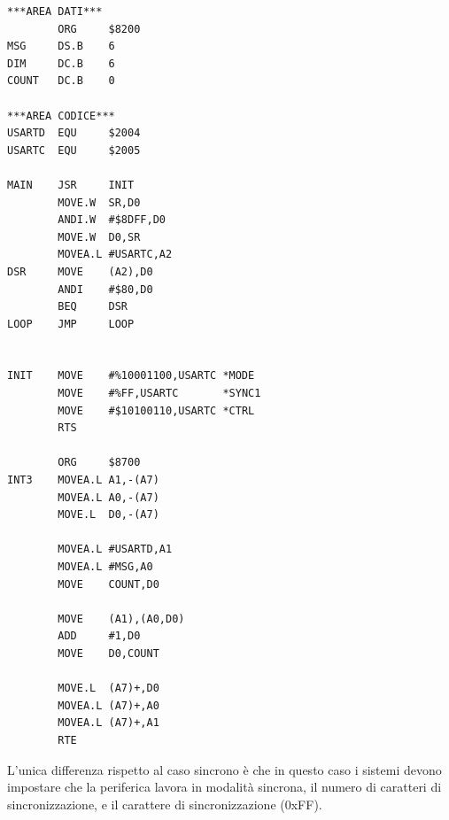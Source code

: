 \begin{lstlisting}
***AREA DATI*** 
        ORG     $8200
MSG     DS.B    6
DIM     DC.B    6
COUNT   DC.B    0

***AREA CODICE*** 
USARTD  EQU     $2004
USARTC  EQU     $2005 

MAIN    JSR     INIT 
        MOVE.W  SR,D0 
        ANDI.W  #$8DFF,D0 
        MOVE.W  D0,SR 
        MOVEA.L #USARTC,A2 
DSR     MOVE    (A2),D0 
        ANDI    #$80,D0
        BEQ     DSR 
LOOP    JMP     LOOP


INIT    MOVE    #%10001100,USARTC *MODE
        MOVE    #%FF,USARTC       *SYNC1 
        MOVE    #$10100110,USARTC *CTRL 
        RTS 

        ORG     $8700
INT3    MOVEA.L A1,-(A7)
        MOVEA.L A0,-(A7)
        MOVE.L  D0,-(A7)

        MOVEA.L #USARTD,A1 
        MOVEA.L #MSG,A0 
        MOVE    COUNT,D0 

        MOVE    (A1),(A0,D0)
        ADD     #1,D0 
        MOVE    D0,COUNT
        
        MOVE.L  (A7)+,D0 
        MOVEA.L (A7)+,A0 
        MOVEA.L (A7)+,A1 
        RTE 
\end{lstlisting}
L'unica differenza rispetto al caso sincrono è che in questo caso i sistemi devono impostare che la periferica lavora in modalità sincrona, il numero di caratteri di sincronizzazione, e il carattere di sincronizzazione (0xFF).
